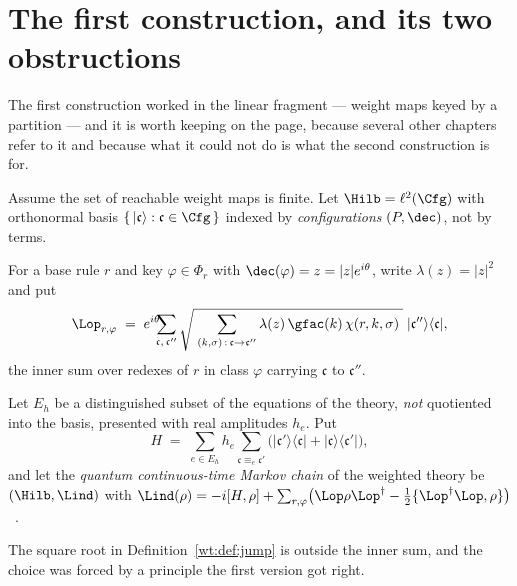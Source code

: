 \section{The first construction, and its two obstructions}
\label{sec:obstruction}

The first construction worked in the linear fragment --- weight maps keyed
by a partition --- and it is worth keeping on the page, because several other
chapters refer to it and because what it could not do is what the second
construction is for.

\begin{definition}
\label{wt:def:hilbert}
Assume the set of reachable weight maps is finite.  Let
$\Hilb = \ell^2(\Cfg)$ with orthonormal basis
$\{\,|\mathfrak{c}\rangle : \mathfrak{c} \in \Cfg\,\}$ indexed by
\emph{configurations} $(P,\dec)$, not by terms.
\end{definition}

\begin{definition}
\label{wt:def:jump}
For a base rule $r$ and key $\varphi \in \Phi_r$ with
$\dec(\varphi) = z = |z|e^{i\theta}$, write $\lambda(z) = |z|^2$ and put
\[
  \Lop_{r,\varphi}
  \;=\;
  e^{i\theta}\!\!\!\sum_{\mathfrak{c},\,\mathfrak{c}''}
  \sqrt{\;\sum_{(k,\sigma)\,:\,\mathfrak{c} \to \mathfrak{c}''}
        \lambda(z)\,\gfac(k)\,\chi(r,k,\sigma)\;}\;
  |\mathfrak{c}''\rangle\langle\mathfrak{c}| ,
\]
the inner sum over redexes of $r$ in class $\varphi$ carrying $\mathfrak{c}$
to $\mathfrak{c}''$.
\end{definition}

\begin{definition}
\label{wt:def:hamiltonian}
Let $E_h$ be a distinguished subset of the equations of the theory,
\emph{not} quotiented into the basis, presented with real amplitudes $h_e$.
Put
\[
  H \;=\; \sum_{e \in E_h} h_e \!\!\sum_{\mathfrak{c} \equiv_e \mathfrak{c}'}\!\!
  \bigl(|\mathfrak{c}'\rangle\langle\mathfrak{c}| + |\mathfrak{c}\rangle\langle\mathfrak{c}'|\bigr),
\]
and let the \emph{quantum continuous-time Markov chain} of the weighted
theory be $(\Hilb, \Lind)$ with
$\Lind(\rho) = -i[H,\rho] + \sum_{r,\varphi}\bigl( \Lop\rho\Lop^{\dagger}
- \tfrac12\{\Lop^{\dagger}\Lop, \rho\}\bigr)$~\cite{cao2021quantum}.
\end{definition}

The square root in Definition~\ref{wt:def:jump} is outside the inner sum, and
the choice was forced by a principle the first version got right.

